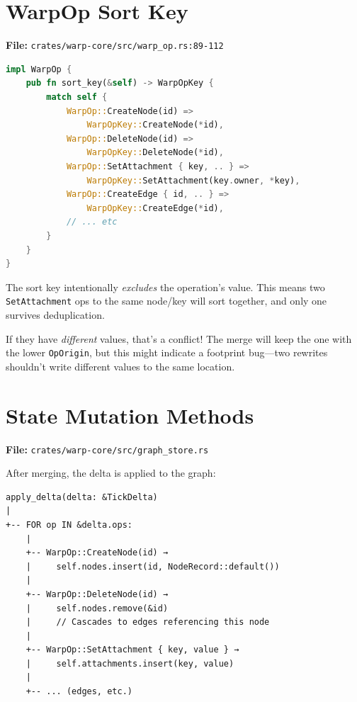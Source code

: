 \section{WarpOp Sort Key}

\textbf{File:} \texttt{crates/warp-core/src/warp\_op.rs:89-112}

\begin{lstlisting}[language=Rust]
impl WarpOp {
    pub fn sort_key(&self) -> WarpOpKey {
        match self {
            WarpOp::CreateNode(id) =>
                WarpOpKey::CreateNode(*id),
            WarpOp::DeleteNode(id) =>
                WarpOpKey::DeleteNode(*id),
            WarpOp::SetAttachment { key, .. } =>
                WarpOpKey::SetAttachment(key.owner, *key),
            WarpOp::CreateEdge { id, .. } =>
                WarpOpKey::CreateEdge(*id),
            // ... etc
        }
    }
}
\end{lstlisting}

\begin{watchout}
The sort key intentionally \emph{excludes} the operation's value. This means two \texttt{SetAttachment} ops to the same node/key will sort together, and only one survives deduplication.

If they have \emph{different} values, that's a conflict! The merge will keep the one with the lower \texttt{OpOrigin}, but this might indicate a footprint bug---two rewrites shouldn't write different values to the same location.
\end{watchout}

\section{State Mutation Methods}

\textbf{File:} \texttt{crates/warp-core/src/graph\_store.rs}

After merging, the delta is applied to the graph:

\begin{verbatim}
apply_delta(delta: &TickDelta)
|
+-- FOR op IN &delta.ops:
    |
    +-- WarpOp::CreateNode(id) →
    |     self.nodes.insert(id, NodeRecord::default())
    |
    +-- WarpOp::DeleteNode(id) →
    |     self.nodes.remove(&id)
    |     // Cascades to edges referencing this node
    |
    +-- WarpOp::SetAttachment { key, value } →
    |     self.attachments.insert(key, value)
    |
    +-- ... (edges, etc.)
\end{verbatim}

